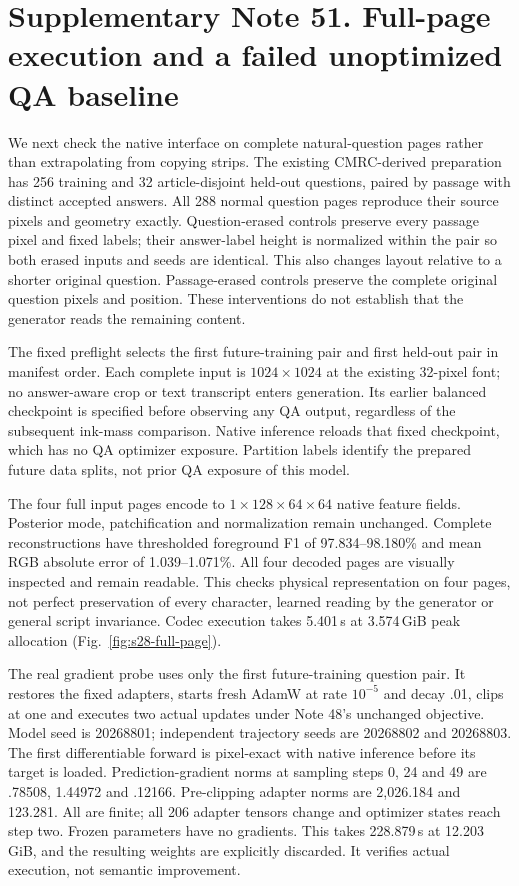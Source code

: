 \clearpage
\section*{Supplementary Note 51. Full-page execution and a failed unoptimized QA baseline}

We next check the native interface on complete natural-question pages rather
than extrapolating from copying strips. The existing CMRC-derived preparation
has 256 training and 32 article-disjoint held-out questions, paired by passage
with distinct accepted answers. All 288 normal question pages reproduce their
source pixels and geometry exactly. Question-erased controls preserve every
passage pixel and fixed labels; their answer-label height is normalized within
the pair so both erased inputs and seeds are identical. This also changes
layout relative to a shorter original question. Passage-erased controls
preserve the complete original question pixels and position. These interventions
do not establish that the generator reads the remaining content.

The fixed preflight selects the first future-training pair and first held-out
pair in manifest order. Each complete input is $1024\times1024$ at the existing
32-pixel font; no answer-aware crop or text transcript enters generation.
Its earlier balanced checkpoint is specified before observing any QA output,
regardless of the subsequent ink-mass comparison. Native inference reloads
that fixed checkpoint, which has no QA optimizer exposure. Partition labels
identify the prepared future data splits, not prior QA exposure of this model.

The four full input pages encode to $1\times128\times64\times64$ native feature
fields. Posterior mode, patchification and normalization remain unchanged.
Complete reconstructions have thresholded foreground F1 of 97.834--98.180\%
and mean RGB absolute error of 1.039--1.071\%. All four decoded pages are
visually inspected and remain readable. This checks physical representation
on four pages, not perfect preservation of every character, learned reading
by the generator or general script invariance. Codec execution takes
5.401\,s at 3.574\,GiB peak allocation (Fig.~\ref{fig:s28-full-page}).

The real gradient probe uses only the first future-training question pair.
It restores the fixed adapters, starts fresh AdamW at rate $10^{-5}$ and decay
.01, clips at one and executes two actual updates under Note 48's unchanged
objective. Model seed is 20268801; independent trajectory seeds are 20268802
and 20268803. The first differentiable forward is pixel-exact with native
inference before its target is loaded. Prediction-gradient norms at sampling
steps 0, 24 and 49 are .78508, 1.44972 and .12166. Pre-clipping adapter norms
are 2,026.184 and 123.281. All are finite; all 206 adapter tensors change and
optimizer states reach step two. Frozen parameters have no gradients. This
takes 228.879\,s at 12.203\,GiB, and the resulting weights are explicitly
discarded. It verifies actual execution, not semantic improvement.

